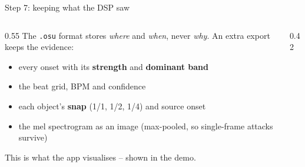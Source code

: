 \documentclass[aspectratio=169,11pt]{beamer}
\begin{document}
\begin{frame}{Step 7: keeping what the DSP saw}
  \begin{columns}[c]
    \begin{column}{0.55\textwidth}
      The \texttt{.osu} format stores \emph{where} and \emph{when}, never \emph{why}.
      An extra export keeps the evidence:
      \begin{itemize}
        \item every onset with its \textbf{strength} and \textbf{dominant band}
        \item the beat grid, BPM and confidence
        \item each object's \textbf{snap} (1/1, 1/2, 1/4) and source onset
        \item the mel spectrogram as an image (max-pooled, so single-frame attacks survive)
      \end{itemize}
      \medskip
      {\color{muted}This is what the app visualises -- shown in the demo.}
    \end{column}
    \begin{column}{0.42\textwidth}
    \end{column}
  \end{columns}
\end{frame}

\end{document}

